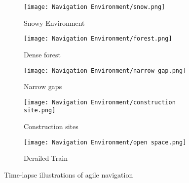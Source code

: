 \begin{figure}
	\centering
	\begin{subfigure}[b]{\textwidth}
		\centering
		\texttt{[image: Navigation Environment/snow.png]}
		\caption{Snowy Environment}
	\end{subfigure}
	\hfill
	\begin{subfigure}[b]{0.48\textwidth}
		\centering
		\texttt{[image: Navigation Environment/forest.png]}
		\caption{Dense forest}
	\end{subfigure}
	\hfill	
	\begin{subfigure}[b]{0.48\textwidth}
		\centering
		\texttt{[image: Navigation Environment/narrow gap.png]}
		\caption{Narrow gaps}
	\end{subfigure}
	\hfill
	\begin{subfigure}[b]{0.48\textwidth}
		\centering
		\texttt{[image: Navigation Environment/construction site.png]}
		\caption{Construction sites}
	\end{subfigure}
	\hfill
	\begin{subfigure}[b]{0.48\textwidth}
		\centering
		\texttt{[image: Navigation Environment/open space.png]}
		\caption{Derailed Train}
	\end{subfigure}
	
	\caption{Time-lapse illustrations of agile navigation}
	\label{fig:navigation real envt}
\end{figure}